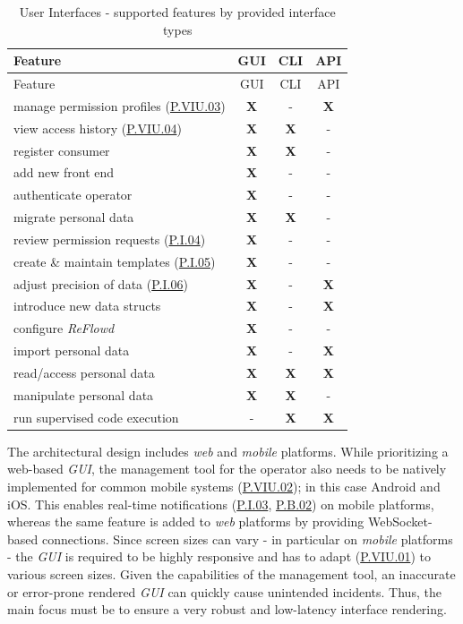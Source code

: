 \documentclass[12pt,english,a4paper,titlepage,cleardoublepage=empty,dottedtoc]{report}
\begin{document}
\begin{longtable}[]{@{}lccc@{}}
\caption{User Interfaces - supported features by provided interface
types \label{tbl:ui-features}}\tabularnewline
\toprule
Feature & GUI & CLI & API\tabularnewline
\midrule
\endfirsthead
\toprule
Feature & GUI & CLI & API\tabularnewline
\midrule
\endhead
manage permission profiles (\protect\hyperlink{pviu03}{P.VIU.03}) &
\textbf{X} & - & \textbf{X}\tabularnewline
view access history (\protect\hyperlink{pviu04}{P.VIU.04}) & \textbf{X}
& \textbf{X} & -\tabularnewline
register consumer & \textbf{X} & \textbf{X} & -\tabularnewline
add new front end & \textbf{X} & - & -\tabularnewline
authenticate operator & \textbf{X} & - & -\tabularnewline
migrate personal data & \textbf{X} & \textbf{X} & -\tabularnewline
review permission requests (\protect\hyperlink{pi04}{P.I.04}) &
\textbf{X} & - & -\tabularnewline
create \& maintain templates (\protect\hyperlink{pi05}{P.I.05}) &
\textbf{X} & - & -\tabularnewline
adjust precision of data (\protect\hyperlink{pi06}{P.I.06}) & \textbf{X}
& - & \textbf{X}\tabularnewline
introduce new data structs & \textbf{X} & - & \textbf{X}\tabularnewline
configure \emph{ReFlowd} & \textbf{X} & - & -\tabularnewline
import personal data & \textbf{X} & - & \textbf{X}\tabularnewline
read/access personal data & \textbf{X} & \textbf{X} &
\textbf{X}\tabularnewline
manipulate personal data & \textbf{X} & \textbf{X} & -\tabularnewline
run supervised code execution & - & \textbf{X} &
\textbf{X}\tabularnewline
\bottomrule
\end{longtable}

The architectural design includes \emph{web} and \emph{mobile}
platforms. While prioritizing a web-based \emph{GUI}, the management
tool for the operator also needs to be natively implemented for common
mobile systems (\protect\hyperlink{pviu02}{P.VIU.02}); in this case
Android and iOS. This enables real-time notifications
(\protect\hyperlink{pi03}{P.I.03}, \protect\hyperlink{pb02}{P.B.02}) on
mobile platforms, whereas the same feature is added to \emph{web}
platforms by providing WebSocket-based connections. Since screen sizes
can vary - in particular on \emph{mobile} platforms - the \emph{GUI} is
required to be highly responsive and has to adapt
(\protect\hyperlink{pviu01}{P.VIU.01}) to various screen sizes. Given
the capabilities of the management tool, an inaccurate or error-prone
rendered \emph{GUI} can quickly cause unintended incidents. Thus, the
main focus must be to ensure a very robust and low-latency interface
rendering.
\end{document}
